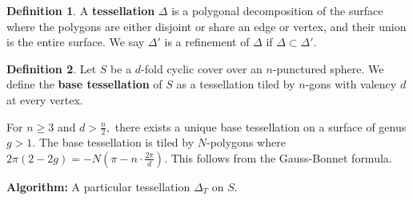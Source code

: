 \documentclass[12pt,reqno]{amsart}
\DeclareMathOperator{\Aut}{Aut}
\theoremstyle{definition}
\newtheorem{defn}{Definition}
\theoremstyle{remark}
\newcommand{\DD}{\Delta\kern -8.3pt {\diamond} \kern -4.5pt \cdot \:}
\begin{document}
\begin{defn} A \textbf{tessellation} $\Delta$ is a polygonal decomposition of the surface where the polygons are either disjoint or share an edge or vertex, and their union is the entire surface. We say $\Delta'$ is a refinement of $\Delta$ if $\Delta \subset \Delta'$. \end{defn}

\begin{defn} \label{defn: base tess} Let $S$ be a $d$-fold cyclic cover over an $n$-punctured sphere. We define the \textbf{base tessellation} of $S$ as a tessellation tiled by $n$-gons with valency $d$ at every vertex. \end{defn}

For $n \geq 3$ and $d > \frac{n}{2},$ there exists a unique base tessellation on a surface of genus $g > 1.$ The base tessellation is tiled by $N$-polygons where $2 \pi (2 - 2 g) = -N (\pi - n \cdot \frac{2 \pi}{d}).$ This follows from the Gauss-Bonnet formula. 



\textbf{Algorithm:} A particular tessellation $\Delta_T$ on $S$.


\end{document}
